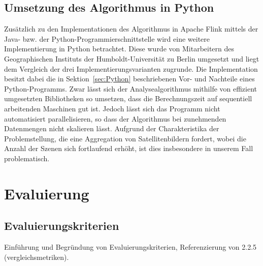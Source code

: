 \section{Umsetzung des Algorithmus in Python}
Zusätzlich zu den Implementationen des Algorithmus in Apache Flink mittels der Java- bzw. der Python-Programmierschnittstelle wird eine weitere Implementierung in Python betrachtet. Diese wurde von Mitarbeitern des Geographischen Instituts der Humboldt-Universität zu Berlin umgesetzt und liegt dem Vergleich der drei Implementierungsvarianten zugrunde. Die Implementation besitzt dabei die in Sektion~\ref{sec:Python} beschriebenen Vor- und Nachteile eines Python-Programms. Zwar lässt sich der Analysealgorithmus mithilfe von effizient umgesetzten Bibliotheken so umsetzen, dass die Berechnungszeit auf sequentiell arbeitenden Maschinen gut ist. Jedoch lässt sich das Programm nicht automatisiert parallelisieren, so dass der Algorithmus bei zunehmenden Datenmengen nicht skalieren lässt. Aufgrund der Charakteristika der Problemstellung, die eine Aggregation von Satellitenbildern fordert, wobei die Anzahl der Szenen sich fortlaufend erhöht, ist dies insbesondere in unserem Fall problematisch.
\newline


\chapter{Evaluierung}
\section{Evaluierungskriterien}
Einführung und Begründung von Evaluierungskriterien, Referenzierung von 2.2.5 (vergleichsmetriken).

